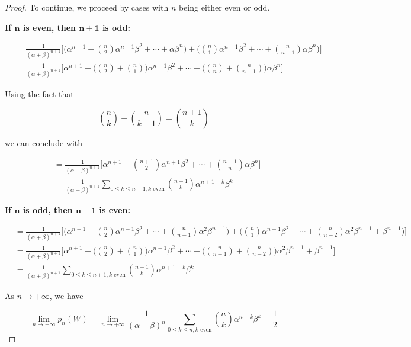 \documentclass[10pt, oneside]{article}   	%
\theoremstyle{definition}
\begin{document}
\begin{enumerate}[label=3.\arabic*]
\begin{proof}
To continue, we proceed by cases with $n$ being either even or odd.

\textbf{If $\bm{n}$ is even, then $\bm{n+1}$ is odd:}

\begin{align*}
&= \frac{1}{(\alpha + \beta)^{n+1}} \bigg[ \bigg( \alpha^{n+1} + \binom{n}{2} \alpha^{n-1} \beta^2 + \cdots + \alpha \beta^n \bigg) + \bigg( \binom{n}{1} \alpha^{n-1} \beta^2 + \cdots + \binom{n}{n-1} \alpha \beta^n \bigg) \bigg] \\
&= \frac{1}{(\alpha + \beta)^{n+1}} \bigg[ \alpha^{n+1} + \bigg( \binom{n}{2} + \binom{n}{1} \bigg) \alpha^{n-1} \beta^2 + \cdots + \bigg( \binom{n}{n} + \binom{n}{n-1} \bigg) \alpha \beta^n \bigg]
\end{align*}

Using the fact that

\[ \binom{n}{k} + \binom{n}{k-1} = \binom{n+1}{k} \]

we can conclude with

\begin{align*}
&= \frac{1}{(\alpha + \beta)^{n+1}} \bigg[ \alpha^{n+1} + \binom{n+1}{2} \alpha^{n+1} \beta^2 + \cdots + \binom{n+1}{n} 
\alpha \beta^n \bigg] \\
&= \boxed{ \frac{1}{(\alpha + \beta)^{n+1}} \sum_{0 \leq k \leq n+1, k \text{ even}} \binom{n+1}{k} \alpha^{n+1-k} \beta^k }
\end{align*}

\textbf{If $\bm{n}$ is odd, then $\bm{n+1}$ is even:}

\begin{align*}
&= \frac{1}{(\alpha + \beta)^{n+1}} \bigg[ \bigg( \alpha^{n+1} + \binom{n}{2} \alpha^{n-1} \beta^2 + \cdots + \binom{n}{n-1} \alpha^2 \beta^{n-1} \bigg) + \bigg( \binom{n}{1} \alpha^{n-1} \beta^2 + \cdots + \binom{n}{n-2} \alpha^2 \beta^{n-1} + \beta^{n+1} \bigg) \bigg] \\
&= \frac{1}{(\alpha + \beta)^{n+1}} \bigg[ \alpha^{n+1} + \bigg( \binom{n}{2} + \binom{n}{1} \bigg) \alpha^{n-1} \beta^2 + \cdots + \bigg( \binom{n}{n-1} + \binom{n}{n-2} \bigg) \alpha^2 \beta^{n-1} + \beta^{n+1} \bigg] \\
&= \boxed{ \frac{1}{(\alpha + \beta)^{n+1}} \sum_{0 \leq k \leq n + 1, k \text{ even}} \binom{n+1}{k} \alpha^{n+1-k} \beta^k }
\end{align*}

As $n \rightarrow + \infty$, we have

\[ \lim_{n \rightarrow + \infty} p_n (W) = \lim_{n \rightarrow +\infty} \frac{1}{(\alpha + \beta)^n} \sum_{0 \leq k \leq n, k \text{ even}} \binom{n}{k} \alpha^{n - k} \beta^k = \boxed{\frac{1}{2}} \]


\end{proof}
\end{enumerate}
\end{document}
